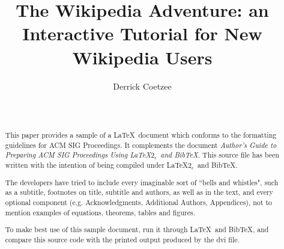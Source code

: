 \documentclass{acm_proc_article-sp}
\begin{document}
\title{The Wikipedia Adventure: an Interactive Tutorial for New Wikipedia Users}

%
\author{
\alignauthor
Derrick Coetzee \\
       \\
       \\
}

\maketitle
\begin{abstract}
This paper provides a sample of a \LaTeX\ document which conforms to
the formatting guidelines for ACM SIG Proceedings.
It complements the document \textit{Author's Guide to Preparing
ACM SIG Proceedings Using \LaTeX$2_\epsilon$\ and Bib\TeX}. This
source file has been written with the intention of being
compiled under \LaTeX$2_\epsilon$\ and BibTeX.

The developers have tried to include every imaginable sort
of ``bells and whistles", such as a subtitle, footnotes on
title, subtitle and authors, as well as in the text, and
every optional component (e.g. Acknowledgments, Additional
Authors, Appendices), not to mention examples of
equations, theorems, tables and figures.

To make best use of this sample document, run it through \LaTeX\
and BibTeX, and compare this source code with the printed
output produced by the dvi file.
\end{abstract}

\end{document}
